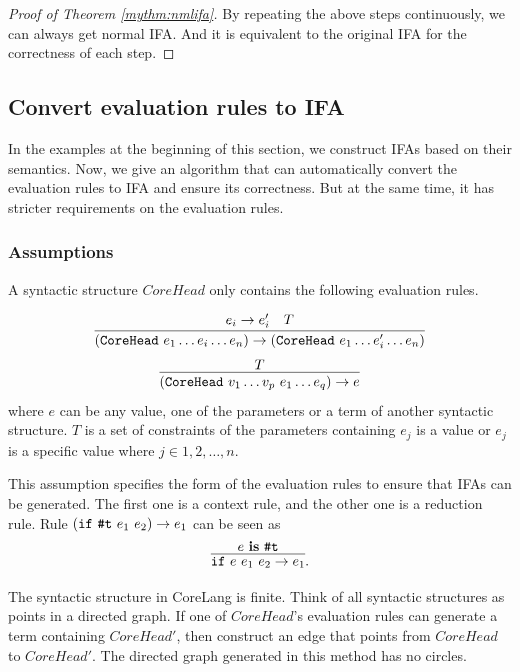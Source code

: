 \begin{proof}[Proof of Theorem \ref{mythm:nmlifa}]
By repeating the above steps continuously, we can always get normal IFA. And it is equivalent to the original IFA for the correctness of each step.
\end{proof}

\subsection{Convert evaluation rules to IFA}

In the examples at the beginning of this section, we construct IFAs based on their semantics. Now, we give an algorithm that can automatically convert the evaluation rules to IFA and ensure its correctness. But at the same time, it has stricter requirements on the evaluation rules.

\subsubsection{Assumptions}

\begin{Asm}
\label{Asm:rules}
A syntactic structure $CoreHead$ only contains the following evaluation rules.

\[
\infer
{(\m{CoreHead}~e_1 \ldots e_i \ldots e_n) \to (\m{CoreHead}~e_1 \ldots e_i' \ldots e_n)}{e_i \to e_i'\quad T}
\]
\[
\infer{(\m{CoreHead}~v_1 \ldots v_p~e_1 \ldots e_q) \to e}{T}
\]
where $e$ can be any value, one of the parameters or a term of another syntactic structure. $T$ is a set of constraints of the parameters containing $e_j$ is a value or $e_j$ is a specific value where $j \in 1,2,\ldots,n$.
\end{Asm}

This assumption specifies the form of the evaluation rules to ensure that IFAs can be generated. The first one is a context rule, and the other one is a reduction rule. Rule $(\mbox{\tt if}~\mbox{\tt \#t}~e_1~e_2) \to e_1$ can be seen as \[\infer{\m{if}~e~e_1~e_2 \to e_1}{e~\key{is}~\m{\#t}}.\]

\begin{Asm}
\label{Asm:orderliness}
The syntactic structure in CoreLang is finite. Think of all syntactic structures as points in a directed graph. If one of $CoreHead$'s evaluation rules can generate a term containing $CoreHead'$, then construct an edge that points from $CoreHead$ to $CoreHead'$. The directed graph generated in this method has no circles.
\end{Asm}

